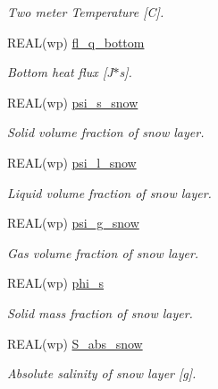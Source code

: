 \begin{DoxyCompactItemize}
\begin{DoxyCompactList}\small\item\em Two meter Temperature \mbox{[}C\mbox{]}. \item\end{DoxyCompactList}\item 
REAL(wp) \hyperlink{namespacemo__data_acd16d86818624a2eb95bfed83a2a1d76}{fl\_\-q\_\-bottom}
\begin{DoxyCompactList}\small\item\em Bottom heat flux \mbox{[}J$\ast$s\mbox{]}. \item\end{DoxyCompactList}\item 
REAL(wp) \hyperlink{namespacemo__data_a05df5047190129b7388a1ad5804ef145}{psi\_\-s\_\-snow}
\begin{DoxyCompactList}\small\item\em Solid volume fraction of snow layer. \item\end{DoxyCompactList}\item 
REAL(wp) \hyperlink{namespacemo__data_a914d1e046ed2bfa66d84f8aecb2ed26f}{psi\_\-l\_\-snow}
\begin{DoxyCompactList}\small\item\em Liquid volume fraction of snow layer. \item\end{DoxyCompactList}\item 
REAL(wp) \hyperlink{namespacemo__data_a2ca2bd9402672a8327e4a68b3a14fd7f}{psi\_\-g\_\-snow}
\begin{DoxyCompactList}\small\item\em Gas volume fraction of snow layer. \item\end{DoxyCompactList}\item 
REAL(wp) \hyperlink{namespacemo__data_aee41245a2d1d08be740021dfc14cf723}{phi\_\-s}
\begin{DoxyCompactList}\small\item\em Solid mass fraction of snow layer. \item\end{DoxyCompactList}\item 
REAL(wp) \hyperlink{namespacemo__data_afacea50e8d2e4a7725adb27d613ca4c3}{S\_\-abs\_\-snow}
\begin{DoxyCompactList}\small\item\em Absolute salinity of snow layer \mbox{[}g\mbox{]}. \item\end{DoxyCompactList}\item 

\end{DoxyCompactItemize}
